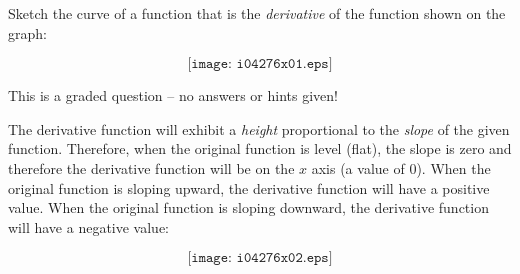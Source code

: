 

Sketch the curve of a function that is the {\it derivative} of the function shown on the graph:

$$\texttt{[image: i04276x01.eps]}$$

\vfil

\eject






This is a graded question -- no answers or hints given!







The derivative function will exhibit a {\it height} proportional to the {\it slope} of the given function.  Therefore, when the original function is level (flat), the slope is zero and therefore the derivative function will be on the $x$ axis (a value of 0).  When the original function is sloping upward, the derivative function will have a positive value.  When the original function is sloping downward, the derivative function will have a negative value:

$$\texttt{[image: i04276x02.eps]}$$





